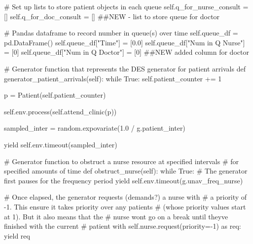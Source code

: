 \documentclass[
  letterpaper,
  DIV=11,
  numbers=noendperiod]{scrreprt}
\newenvironment{Shaded}{\begin{snugshade}}{\end{snugshade}}
\newcommand{\CommentTok}[1]{\textcolor[rgb]{0.37,0.37,0.37}{#1}}
\newcommand{\ControlFlowTok}[1]{\textcolor[rgb]{0.00,0.23,0.31}{#1}}
\newcommand{\DecValTok}[1]{\textcolor[rgb]{0.68,0.00,0.00}{#1}}
\newcommand{\FloatTok}[1]{\textcolor[rgb]{0.68,0.00,0.00}{#1}}
\newcommand{\ImportTok}[1]{\textcolor[rgb]{0.00,0.46,0.62}{#1}}
\newcommand{\KeywordTok}[1]{\textcolor[rgb]{0.00,0.23,0.31}{#1}}
\newcommand{\NormalTok}[1]{\textcolor[rgb]{0.00,0.23,0.31}{#1}}
\newcommand{\OperatorTok}[1]{\textcolor[rgb]{0.37,0.37,0.37}{#1}}
\newcommand{\StringTok}[1]{\textcolor[rgb]{0.13,0.47,0.30}{#1}}
\newcommand{\VariableTok}[1]{\textcolor[rgb]{0.07,0.07,0.07}{#1}}
\begin{document}
\begin{tcolorbox}
\begin{Shaded}
\begin{Highlighting}[]
        \CommentTok{\# Set up lists to store patient objects in each queue}
        \VariableTok{self}\NormalTok{.q\_for\_nurse\_consult }\OperatorTok{=}\NormalTok{ []}
        \VariableTok{self}\NormalTok{.q\_for\_doc\_consult }\OperatorTok{=}\NormalTok{ [] }\CommentTok{\#\#NEW {-} list to store queue for doctor}

        \CommentTok{\# Pandas dataframe to record number in queue(s) over time}
        \VariableTok{self}\NormalTok{.queue\_df }\OperatorTok{=}\NormalTok{ pd.DataFrame()}
        \VariableTok{self}\NormalTok{.queue\_df[}\StringTok{"Time"}\NormalTok{] }\OperatorTok{=}\NormalTok{ [}\FloatTok{0.0}\NormalTok{]}
        \VariableTok{self}\NormalTok{.queue\_df[}\StringTok{"Num in Q Nurse"}\NormalTok{] }\OperatorTok{=}\NormalTok{ [}\DecValTok{0}\NormalTok{]}
        \VariableTok{self}\NormalTok{.queue\_df[}\StringTok{"Num in Q Doctor"}\NormalTok{] }\OperatorTok{=}\NormalTok{ [}\DecValTok{0}\NormalTok{] }\CommentTok{\#\#NEW added column for doctor}

    \CommentTok{\# Generator function that represents the DES generator for patient arrivals}
    \KeywordTok{def}\NormalTok{ generator\_patient\_arrivals(}\VariableTok{self}\NormalTok{):}
        \ControlFlowTok{while} \VariableTok{True}\NormalTok{:}
            \VariableTok{self}\NormalTok{.patient\_counter }\OperatorTok{+=} \DecValTok{1}

\NormalTok{            p }\OperatorTok{=}\NormalTok{ Patient(}\VariableTok{self}\NormalTok{.patient\_counter)}

            \VariableTok{self}\NormalTok{.env.process(}\VariableTok{self}\NormalTok{.attend\_clinic(p))}

\NormalTok{            sampled\_inter }\OperatorTok{=}\NormalTok{ random.expovariate(}\FloatTok{1.0} \OperatorTok{/}\NormalTok{ g.patient\_inter)}

            \ControlFlowTok{yield} \VariableTok{self}\NormalTok{.env.timeout(sampled\_inter)}

    \CommentTok{\# Generator function to obstruct a nurse resource at specified intervals}
    \CommentTok{\# for specified amounts of time}
    \KeywordTok{def}\NormalTok{ obstruct\_nurse(}\VariableTok{self}\NormalTok{):}
        \ControlFlowTok{while} \VariableTok{True}\NormalTok{:}
            \CommentTok{\# The generator first pauses for the frequency period}
            \ControlFlowTok{yield} \VariableTok{self}\NormalTok{.env.timeout(g.unav\_freq\_nurse)}

            \CommentTok{\# Once elapsed, the generator requests (demands?) a nurse with}
            \CommentTok{\# a priority of {-}1.  This ensure it takes priority over any patients}
            \CommentTok{\# (whose priority values start at 1).  But it also means that the}
            \CommentTok{\# nurse won\textquotesingle{}t go on a break until they\textquotesingle{}ve finished with the current}
            \CommentTok{\# patient}
            \ControlFlowTok{with} \VariableTok{self}\NormalTok{.nurse.request(priority}\OperatorTok{={-}}\DecValTok{1}\NormalTok{) }\ImportTok{as}\NormalTok{ req:}
                \ControlFlowTok{yield}\NormalTok{ req}


\end{Highlighting}
\end{Shaded}
\end{tcolorbox}
\end{document}
